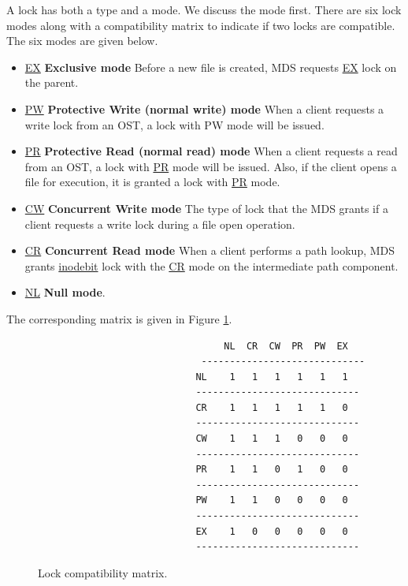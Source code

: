 A lock has both a type and a mode. We discuss the mode first. There are
six lock modes along with a compatibility matrix to indicate if two
locks are compatible. The six modes are given below.

\begin{itemize}

\item \url{EX} \textbf{Exclusive mode} Before a new file is created, MDS
requests \url{EX} lock on the parent.

\item \url{PW}  \textbf{Protective Write (normal write) mode} When a client
requests a  write lock from an OST, a lock with PW mode will be issued.

\item \url{PR}  \textbf{Protective Read (normal read) mode} When a client
requests a read from an OST, a lock with \url{PR} mode will be issued. Also, if
the client opens a file for execution, it is granted a lock with \url{PR} mode.

\item \url{CW}  \textbf{Concurrent Write mode} The type of lock that the MDS
grants if a client requests a write lock during a file open operation.

\item \url{CR}  \textbf{Concurrent Read mode} When a client performs a path
lookup, MDS grants \url{inodebit} lock with the \url{CR} mode on the
intermediate path component.

\item \url{NL}  \textbf{Null mode}.

\end{itemize}

The corresponding matrix is given in Figure \ref{fig:matrix}.

\begin{figure}[htb]
\centering
\begin{Verbatim}
                                 NL  CR  CW  PR  PW  EX
                             -----------------------------
                            NL    1   1   1   1   1   1
                            -----------------------------
                            CR    1   1   1   1   1   0 
                            -----------------------------
                            CW    1   1   1   0   0   0  
                            -----------------------------
                            PR    1   1   0   1   0   0
                            -----------------------------
                            PW    1   1   0   0   0   0 
                            -----------------------------
                            EX    1   0   0   0   0   0 
                            -----------------------------
\end{Verbatim}
\caption{Lock compatibility matrix.}
\label{fig:matrix}
\end{figure}

